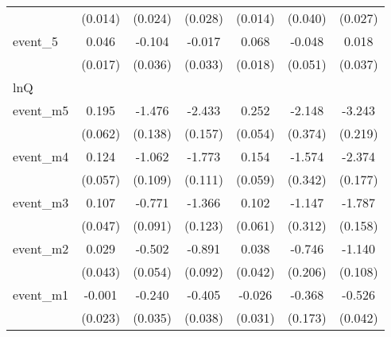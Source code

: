 {\begin{tabular}{l*{6}{c}}
            &     (0.014)         &     (0.024)         &     (0.028)         &     (0.014)         &     (0.040)         &     (0.027)         \\
[1em]
event\_5     &       0.046\sym{**} &      -0.104\sym{**} &      -0.017         &       0.068\sym{***}&      -0.048         &       0.018         \\
            &     (0.017)         &     (0.036)         &     (0.033)         &     (0.018)         &     (0.051)         &     (0.037)         \\
\hline
lnQ         &                     &                     &                     &                     &                     &                     \\
event\_m5    &       0.195\sym{**} &      -1.476\sym{***}&      -2.433\sym{***}&       0.252\sym{***}&      -2.148\sym{***}&      -3.243\sym{***}\\
            &     (0.062)         &     (0.138)         &     (0.157)         &     (0.054)         &     (0.374)         &     (0.219)         \\
[1em]
event\_m4    &       0.124\sym{*}  &      -1.062\sym{***}&      -1.773\sym{***}&       0.154\sym{**} &      -1.574\sym{***}&      -2.374\sym{***}\\
            &     (0.057)         &     (0.109)         &     (0.111)         &     (0.059)         &     (0.342)         &     (0.177)         \\
[1em]
event\_m3    &       0.107\sym{*}  &      -0.771\sym{***}&      -1.366\sym{***}&       0.102         &      -1.147\sym{***}&      -1.787\sym{***}\\
            &     (0.047)         &     (0.091)         &     (0.123)         &     (0.061)         &     (0.312)         &     (0.158)         \\
[1em]
event\_m2    &       0.029         &      -0.502\sym{***}&      -0.891\sym{***}&       0.038         &      -0.746\sym{***}&      -1.140\sym{***}\\
            &     (0.043)         &     (0.054)         &     (0.092)         &     (0.042)         &     (0.206)         &     (0.108)         \\
[1em]
event\_m1    &      -0.001         &      -0.240\sym{***}&      -0.405\sym{***}&      -0.026         &      -0.368\sym{*}  &      -0.526\sym{***}\\
            &     (0.023)         &     (0.035)         &     (0.038)         &     (0.031)         &     (0.173)         &     (0.042)         \\

\end{tabular}}
